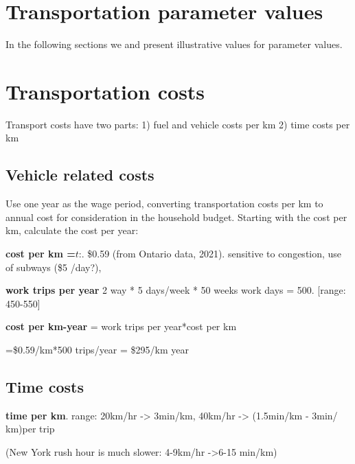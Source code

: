 \section{Transportation parameter values}
In the following sections we and present illustrative values for parameter values.


  
    
    
    
 

\section{Transportation costs}
Transport costs have two parts:
1) fuel and vehicle costs per km
2) time costs per km

\subsection{Vehicle related costs}
Use one year as the wage period, converting transportation costs per km to annual cost for consideration in the household budget. Starting with the cost per km, calculate the cost per year:

\textbf{cost per km =$\textit{t}$}:. \$0.59   (from  Ontario data, 2021). sensitive to congestion, use of subways (\$5 /day?), 

 \textbf{work trips per year} 2 way * 5 days/week * 50 weeks work days = 500. [range: 450-550]

\textbf{cost per km-year} = work trips per year*cost per km

=\$0.59/km*500 trips/year  =  \$295/km year 



\subsection{Time costs}
\textbf{time per km}. range: 20km/hr -> 3min/km, 40km/hr -> (1.5min/km - 3min/ km)per trip 

(New York rush hour is much slower:  4-9km/hr ->6-15 min/km)


